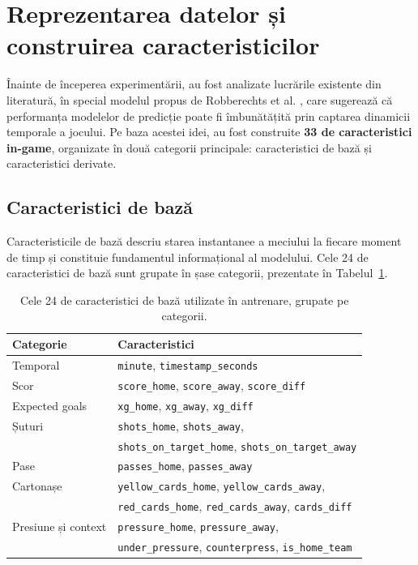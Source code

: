 \section{Reprezentarea datelor și construirea caracteristicilor}
\label{sec:feature_engineering}

Înainte de începerea experimentării, au fost analizate lucrările existente
din literatură, în special modelul propus de Robberechts et al.
\cite{Robberechts2019}, care sugerează că performanța modelelor de
predicție poate fi îmbunătățită prin captarea dinamicii temporale a
jocului. Pe baza acestei idei, au fost construite \textbf{33 de
caracteristici in-game}, organizate în două categorii principale:
caracteristici de bază și caracteristici derivate.

\subsection{Caracteristici de bază}

Caracteristicile de bază descriu starea instantanee a meciului la fiecare
moment de timp și constituie fundamentul informațional al modelului. Cele
24 de caracteristici de bază sunt grupate în șase categorii, prezentate în
Tabelul~\ref{tab:features_baza}.

\begin{table}[h!]
\centering
\begin{tabular}{ll}
\hline
\textbf{Categorie} & \textbf{Caracteristici} \\
\hline
Temporal & \texttt{minute}, \texttt{timestamp\_seconds} \\
Scor & \texttt{score\_home}, \texttt{score\_away}, \texttt{score\_diff} \\
Expected goals & \texttt{xg\_home}, \texttt{xg\_away}, \texttt{xg\_diff} \\
Șuturi & \texttt{shots\_home}, \texttt{shots\_away}, \\
       & \texttt{shots\_on\_target\_home}, \texttt{shots\_on\_target\_away} \\
Pase & \texttt{passes\_home}, \texttt{passes\_away} \\
Cartonașe & \texttt{yellow\_cards\_home}, \texttt{yellow\_cards\_away}, \\
          & \texttt{red\_cards\_home}, \texttt{red\_cards\_away},
            \texttt{cards\_diff} \\
Presiune și context & \texttt{pressure\_home}, \texttt{pressure\_away}, \\
                    & \texttt{under\_pressure}, \texttt{counterpress},
                      \texttt{is\_home\_team} \\
\hline
\end{tabular}
\caption{Cele 24 de caracteristici de bază utilizate în antrenare,
         grupate pe categorii.}
\label{tab:features_baza}
\end{table}

